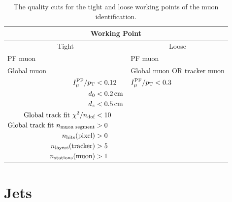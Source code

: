 \documentclass[12pt]{thesis}  %
\begin{document}
\begin{table}[htb]
  \begin{center}
    \begin{tabular}{|l|l|}
\hline
\multicolumn{2}{|c|}{Working Point}\\
\hline
\multicolumn{1}{|c|}{Tight} & \multicolumn{1}{c|}{Loose} \\
\hline
PF muon & PF muon \\
Global muon & Global muon OR tracker muon \\
$\begin{aligned}
I^{\text{PF}}_{\mu}/p_{\mathrm{T}} &< 0.12 \\
d_0 &< 0.2\,\text{cm} \\
d_z &< 0.5\,\text{cm} \\
\text{Global track fit } \chi^2/n_{\text{dof}} &< 10 \\
\text{Global track fit } n_{\text{muon segment}} &> 0 \\
n_{\text{hits}}(\text{pixel}) &> 0 \\
n_{\text{layers}}(\text{tracker}) &> 5 \\
n_{\text{stations}}(\text{muon}) &> 1
\end{aligned}$
&
$\begin{aligned}
I^{\text{PF}}_{\mu}/p_{\mathrm{T}} &< 0.3 \\
\\
\\
\\
\\
\\
\\
\\
\end{aligned}$ \\
\hline
    \end{tabular}
    \caption{The quality cuts for the tight and loose working points of the muon identification.}
    \label{tab:muonWP}
  \end{center}
\end{table}

\section{Jets
\label{sec:jet-reco}}
\end{document}
